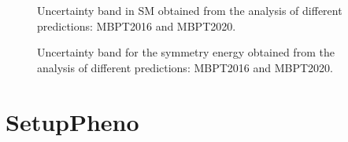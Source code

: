 \documentclass[letterpaper,10pt,english]{sphinxmanual}
\begin{document}
\begin{figure}[htbp]
\centering
\capstart

\noindent{}
\caption{Uncertainty band in SM obtained from the analysis of different predictions: MBPT\sphinxhyphen{}2016 and MBPT\sphinxhyphen{}2020.}\label{\detokenize{source/api/setup_micro_band:id2}}\end{figure}

\begin{figure}[htbp]
\centering
\capstart

\noindent{}
\caption{Uncertainty band for the symmetry energy obtained from the analysis of different predictions: MBPT\sphinxhyphen{}2016 and MBPT\sphinxhyphen{}2020.}\label{\detokenize{source/api/setup_micro_band:id3}}\end{figure}

\sphinxstepscope


\section{SetupPheno}
\label{\detokenize{source/api/setup_pheno:setuppheno}}\label{\detokenize{source/api/setup_pheno::doc}}\label{\detokenize{source/api/setup_pheno:module-nucleardatapy.setup_pheno}}
\end{document}
